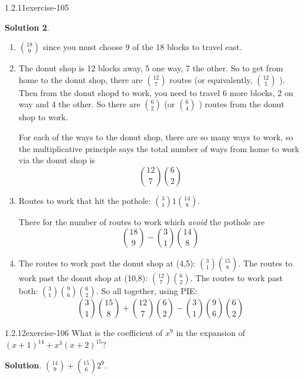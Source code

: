 \documentclass[twoside,11pt,]{book}
\numberwithin{equation}{chapter}
\begin{document}
\begin{divisionsolution}{1.2.11}{}{exercise-105}
\begin{enumerate}[label=(\alph*)]
\end{enumerate}
%
\par\smallskip%
\noindent\textbf{Solution 2}.\quad%
\hypertarget{p-1713}{}%
\leavevmode%
\begin{enumerate}[label=(\alph*)]
\item\hypertarget{li-1182}{}\hypertarget{p-1714}{}%
\({18 \choose 9}\) since you must choose 9 of the 18 blocks to travel east.%
\item\hypertarget{li-1183}{}\hypertarget{p-1715}{}%
The donut shop is 12 blocks away, 5 one way, 7 the other. So to get from home to the donut shop, there are \({12 \choose 7}\) routes (or equivalently, \({12 \choose 5}\) ). Then from the donut shopd to work, you need to travel 6 more blocks, 2 on way and 4 the other. So there are \({6 \choose 2}\) (or \({6 \choose 4}\) ) routes from the donut shop to work.%
\par
\hypertarget{p-1716}{}%
For each of the ways to the donut shop, there are so many ways to work, so the multiplicative principle says the total number of ways from home to work via the donut shop is%
\begin{equation*}
\binom{12}{7}\binom{6}{2}
\end{equation*}
%
\item\hypertarget{li-1184}{}\hypertarget{p-1717}{}%
Routes to work that hit the pothole: \({3 \choose 1}1{14 \choose 8}\).%
\par
\hypertarget{p-1718}{}%
There for the number of routes to work which \emph{avoid} the pothole are%
\begin{equation*}
{18 \choose 9} - {3 \choose 1}{14 \choose 8}
\end{equation*}
%
\item\hypertarget{li-1185}{}\hypertarget{p-1719}{}%
The routes to work past the donut shop at (4,5): \({3\choose 1}{15 \choose 8}\). The routes to work past the donut shop at (10,8): \({12 \choose 7}{6 \choose 2}\). The routes to work past both: \({3\choose 1}{9 \choose 6}{6 \choose 2}\). So all together, using PIE:%
\begin{equation*}
{3\choose 1}{15 \choose 8} + {12 \choose 7}{6 \choose 2} - {3\choose 1}{9 \choose 6}{6 \choose 2}
\end{equation*}
%
\end{enumerate}
%
\end{divisionsolution}%
\begin{divisionsolution}{1.2.12}{}{exercise-106}%
\hypertarget{p-1723}{}%
What is the coefficient of \(x^9\) in the expansion of \((x+1)^{14} + x^3(x+2)^{15}\text{?}\)%
\par\smallskip%
\noindent\textbf{Solution}.\quad%
\hypertarget{p-1725}{}%
\({14\choose 9} + {15 \choose 6}2^9\text{.}\)%
\end{divisionsolution}%
\end{document}
